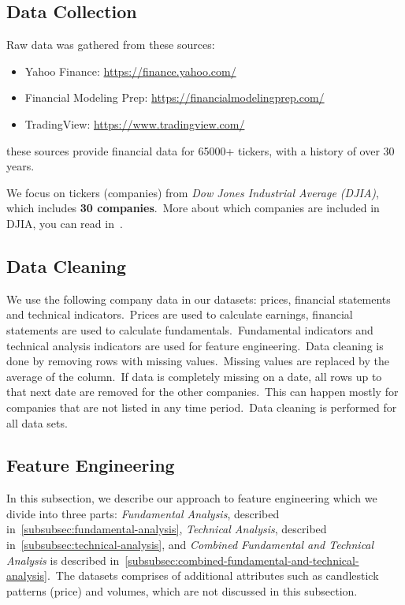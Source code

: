 \documentclass[../xlapes02]{subfiles}
\begin{document}
    \subsection{Data Collection}\label{subsec:data-collection}
    Raw data was gathered from these sources:
    \begin{itemize}
        \label{item:data-sources}
        \item Yahoo Finance: \url{https://finance.yahoo.com/}
        \item Financial Modeling Prep: \url{https://financialmodelingprep.com/}
        \item TradingView: \url{https://www.tradingview.com/}
    \end{itemize}
    these sources provide financial data for 65000+ tickers, with a history of over 30 years.

    We focus on tickers (companies) from \emph{Dow Jones Industrial Average (DJIA)}, which includes \textbf{30 companies}.\ More about which companies are included in DJIA, you can read in~\cite{enwiki:1141766585}.

    \subsection{Data Cleaning}\label{subsec:data-cleaning}
    We use the following company data in our datasets: prices, financial statements and technical indicators.\ Prices are used to calculate earnings, financial statements are used to calculate fundamentals.\ Fundamental indicators and technical analysis indicators are used for feature engineering.\ Data cleaning is done by removing rows with missing values.\ Missing values are replaced by the average of the column.\ If data is completely missing on a date, all rows up to that next date are removed for the other companies.\ This can happen mostly for companies that are not listed in any time period.\ Data cleaning is performed for all data sets.

    \subsection{Feature Engineering}\label{subsec:feature-engineering}
    In this subsection, we describe our approach to feature engineering which we divide into three parts: \emph{Fundamental Analysis}, described in~\cref{subsubsec:fundamental-analysis}, \emph{Technical Analysis}, described in~\cref{subsubsec:technical-analysis}, and \emph{Combined Fundamental and Technical Analysis} is described in~\cref{subsubsec:combined-fundamental-and-technical-analysis}.\ The datasets comprises of additional attributes such as candlestick patterns (price) and volumes, which are not discussed in this subsection.
\end{document}
